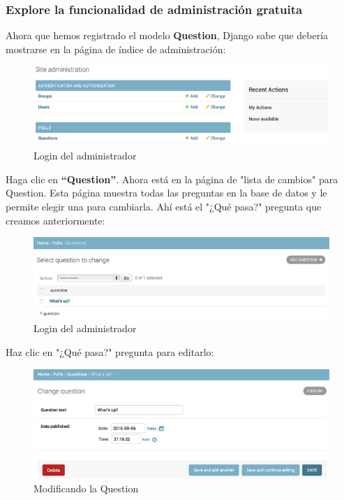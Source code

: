 \documentclass[10pt]{article}
\newcommand{\django}[1]{{\textcolor{G}{Django} #1}}
\begin{document}
\subsubsection*{Explore la funcionalidad de administración gratuita}


Ahora que hemos registrado el modelo \textbf{Question}, \django{} sabe que debería mostrarse en la página de índice de administración:

\begin{figure}[H]
\begin{center}
\includegraphics[scale=0.9]{figuras/325/img4.png}
\caption{Login del administrador}
\end{center}
\end{figure}


Haga clic en \textbf{``Question''}. Ahora está en la página de "lista de cambios" para Question. Esta página muestra todas las preguntas en la base de datos y le permite elegir una para cambiarla. Ahí está el "¿Qué pasa?" pregunta que creamos anteriormente:

\begin{figure}[H]
\begin{center}
\includegraphics[scale=0.9]{figuras/325/img5.png}
\caption{Login del administrador}
\end{center}
\end{figure}


Haz clic en "¿Qué pasa?" pregunta para editarlo:

\begin{figure}[H]
\begin{center}
\includegraphics[scale=0.9]{figuras/325/img6.png}
\caption{Modificando la Question}
\end{center}
\end{figure}
\end{document}
